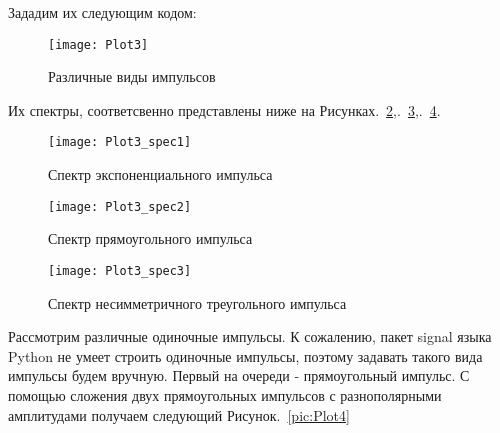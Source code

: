 Зададим их следующим кодом:


\parindent=1cm %

\begin{figure}[H]
	\begin{center}
		\texttt{[image: Plot3]}
		\caption{Различные виды импульсов} 
		\label{pic:Plot3} %
	\end{center}
\end{figure}

Их спектры, соответсвенно представлены ниже на Рисунках.~\ref{pic:Plot3_spec1},.~\ref{pic:Plot3_spec2},.~\ref{pic:Plot3_spec3}.
\begin{figure}[H]
	\begin{center}
		\texttt{[image: Plot3\_spec1]}
		\caption{Спектр экспоненциального импульса} 
		\label{pic:Plot3_spec1} %
	\end{center}
\end{figure}
\begin{figure}[H]
	\begin{center}
		\texttt{[image: Plot3\_spec2]}
		\caption{Спектр прямоугольного импульса} 
		\label{pic:Plot3_spec2} %
	\end{center}
\end{figure}
\begin{figure}[H]
	\begin{center}
		\texttt{[image: Plot3\_spec3]}
		\caption{Спектр несимметричного треугольного импульса} 
		\label{pic:Plot3_spec3} %
	\end{center}
\end{figure}

Рассмотрим различные одиночные импульсы. К сожалению, пакет signal языка Python не умеет строить одиночные импульсы, поэтому задавать такого вида импульсы будем вручную. Первый на очереди - прямоугольный импульс. С помощью сложения двух прямоугольных импульсов с разнополярными амплитудами получаем следующий Рисунок.~\ref{pic:Plot4}



\parindent=1cm %

